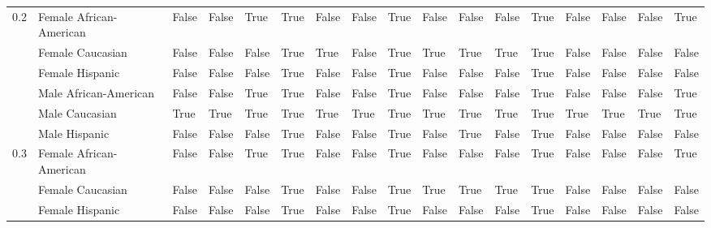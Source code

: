 \begin{tabular}{lllllllllllllllll}
0.2 & Female African-American &       False &          False &        True &           True &       False &                  False &        True &           False &       False &       False &              True &         False &               False &                False &        True \\
    & Female Caucasian &       False &          False &       False &           True &        True &                  False &        True &            True &        True &        True &              True &         False &               False &                False &       False \\
    & Female Hispanic &       False &          False &       False &           True &       False &                  False &        True &           False &       False &       False &              True &         False &               False &                False &       False \\
    & Male African-American &       False &          False &        True &           True &       False &                  False &        True &           False &       False &       False &              True &         False &               False &                False &        True \\
    & Male Caucasian &        True &           True &        True &           True &        True &                   True &        True &            True &        True &        True &              True &          True &                True &                 True &        True \\
    & Male Hispanic &       False &          False &       False &           True &       False &                  False &        True &           False &        True &       False &              True &         False &               False &                False &       False \\
0.3 & Female African-American &       False &          False &        True &           True &       False &                  False &        True &           False &       False &       False &              True &         False &               False &                False &        True \\
    & Female Caucasian &       False &          False &       False &           True &       False &                  False &        True &            True &        True &        True &              True &         False &               False &                False &       False \\
    & Female Hispanic &       False &          False &       False &           True &       False &                  False &        True &           False &       False &       False &              True &         False &               False &                False &       False \\

\end{tabular}
